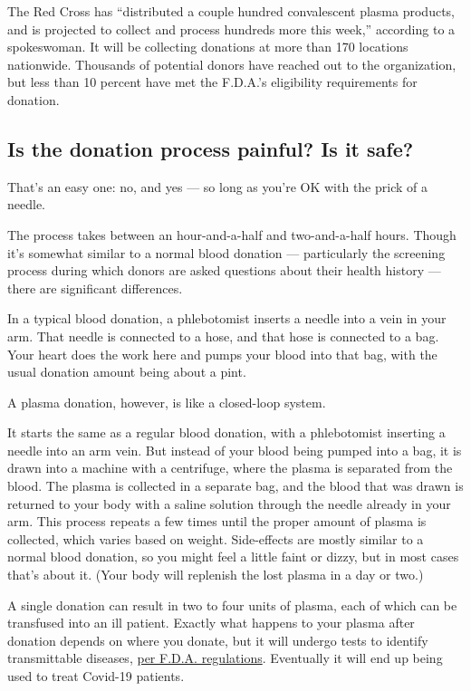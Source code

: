 The Red Cross has ``distributed a couple hundred convalescent plasma
products, and is projected to collect and process hundreds more this
week,'' according to a spokeswoman. It will be collecting donations at
more than 170 locations nationwide. Thousands of potential donors have
reached out to the organization, but less than 10 percent have met the
F.D.A.'s eligibility requirements for donation.

\hypertarget{is-the-donation-process-painful-is-it-safe}{%
\subsection{Is the donation process painful? Is it
safe?}\label{is-the-donation-process-painful-is-it-safe}}

That's an easy one: no, and yes --- so long as you're OK with the prick
of a needle.

The process takes between an hour-and-a-half and two-and-a-half hours.
Though it's somewhat similar to a normal blood donation --- particularly
the screening process during which donors are asked questions about
their health history --- there are significant differences.

In a typical blood donation, a phlebotomist inserts a needle into a vein
in your arm. That needle is connected to a hose, and that hose is
connected to a bag. Your heart does the work here and pumps your blood
into that bag, with the usual donation amount being about a pint.

A plasma donation, however, is like a closed-loop system.

It starts the same as a regular blood donation, with a phlebotomist
inserting a needle into an arm vein. But instead of your blood being
pumped into a bag, it is drawn into a machine with a centrifuge, where
the plasma is separated from the blood. The plasma is collected in a
separate bag, and the blood that was drawn is returned to your body with
a saline solution through the needle already in your arm. This process
repeats a few times until the proper amount of plasma is collected,
which varies based on weight. Side-effects are mostly similar to a
normal blood donation, so you might feel a little faint or dizzy, but in
most cases that's about it. (Your body will replenish the lost plasma in
a day or two.)

A single donation can result in two to four units of plasma, each of
which can be transfused into an ill patient. Exactly what happens to
your plasma after donation depends on where you donate, but it will
undergo tests to identify transmittable diseases,
\href{https://www.ncbi.nlm.nih.gov/books/NBK531504/}{per F.D.A.
regulations}. Eventually it will end up being used to treat Covid-19
patients.

